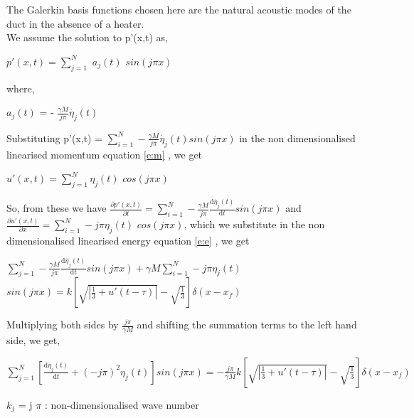\documentclass[8pt]{article} %
\begin{document}
The Galerkin basis functions chosen here are the natural acoustic modes of the duct in the absence of a heater.\\
We assume the solution to p'(x,t) as,\\
\begin{center}
$p'(x,t) = \sum_{j = 1}^{N}$ $ a_j (t)$  $sin\left( j \pi x \right)  $
\end{center}
where,\\
\begin{center}
$a_j (t)$ = - $\frac{\gamma M}{j \pi} \dot{\eta_j}(t)$
\end{center}
Substituting p'(x,t) = $ \sum_{i = 1}^{N}   - \frac{\gamma M}{j \pi} \dot{\eta_j}(t) sin\left( j \pi x \right)  $ in the non dimensionalised linearised momentum equation \eqref{e:m} , we get\\
\begin{center}
$u'(x,t) = \sum_{j = 1}^{N} \eta_j (t)$ $cos\left( j \pi x \right)  $\\
\end{center}
So, from these we have $ \frac{\partial {p'(x,t)}}{\partial {t}}  =  \sum_{i = 1}^{N}   - \frac{\gamma M}{j \pi} \frac{\mathrm{d} \dot{\eta_j}(t)}{\mathrm{d} t} sin\left( j \pi x \right)  $ and $ \frac{\partial {u'(x,t)}}{\partial {x}} = \sum_{i = 1}^{N} -j \pi \eta_j (t)$ $cos\left( j \pi x \right)  $, which we substitute in the non dimensionalised linearised energy equation \eqref{e:e} , we get\\
\begin{center}
$  \sum_{j = 1}^{N}   - \frac{\gamma M}{j \pi} \frac{\mathrm{d} \dot{\eta_j}(t)}{\mathrm{d} t} sin\left( j \pi x \right)   + \gamma M  \sum_{i = 1}^{N} -j \pi \eta_j (t)$ $sin\left( j \pi x \right) =  k \left[ \sqrt{\left| \frac{1}{3} + u'(t-\tau)\right| } - \sqrt{\frac{1}{3}} \right] \delta(x - x_f) $\\
\end{center}
Multiplying both sides by $\frac{j \pi}{\gamma M}$ and shifting the summation terms to the left hand side, we get,\\
\begin{center}
$  \sum_{j = 1}^{N} \left[  \frac{\mathrm{d} \dot{\eta_j}(t)}{\mathrm{d} t}    + (-j \pi )^2  \eta_j (t) \right] sin\left( j \pi x \right) = - \frac{j \pi}{\gamma M} k \left[ \sqrt{\left| \frac{1}{3} + u'(t-\tau)\right| } - \sqrt{\frac{1}{3}} \right] \delta(x - x_f) $\\
\end{center}
$k_j$ = j $\pi$ : non-dimensionalised wave number
\end{document}
